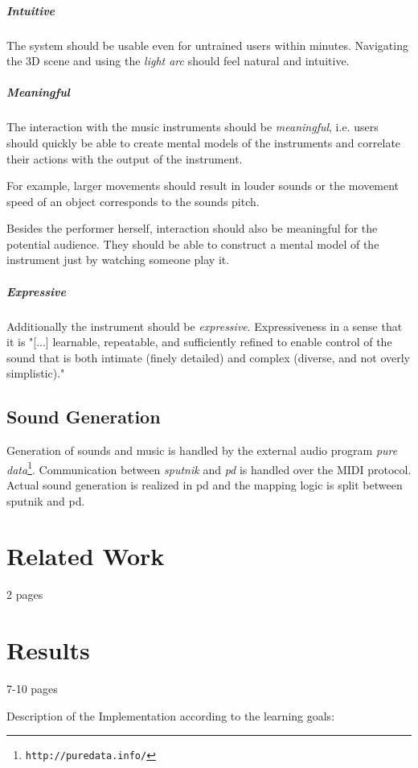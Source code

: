 \documentclass[10pt,a4paper]{scrartcl}
\begin{document}
\subparagraph{Intuitive}
The system should be usable even for untrained users within minutes. Navigating the 3D scene and using the \emph{light arc} should feel natural and intuitive.

\subparagraph{Meaningful}
The interaction with the music instruments should be \emph{meaningful}, i.e. users should quickly be able to create mental models of the instruments and correlate their actions with the output of the instrument. 

For example, larger movements should result in louder sounds or the movement speed of an object corresponds to the sounds pitch.

Besides the performer herself, interaction should also be meaningful for the potential audience. They should be able to construct a mental model of the instrument just by watching someone play it.

\subparagraph{Expressive}
Additionally the instrument should be \emph{expressive}. Expressiveness in a sense that it is "[...] learnable, repeatable, and sufficiently refined to enable control of the sound that is both intimate (finely detailed) and complex (diverse, and not overly simplistic)." \cite{Dobrian2006}

\subsection{Sound Generation}
Generation of sounds and music is handled by the external audio program \emph{pure data}\footnote{\texttt{http://puredata.info/}}. Communication between \emph{sputnik} and \emph{pd} is handled over the MIDI protocol. Actual sound generation is realized in pd and the mapping logic is split between sputnik and pd.



\section{Related Work}
2 pages

\section{Results}
7-10 pages

Description of the Implementation according to the learning goals:
\end{document}

